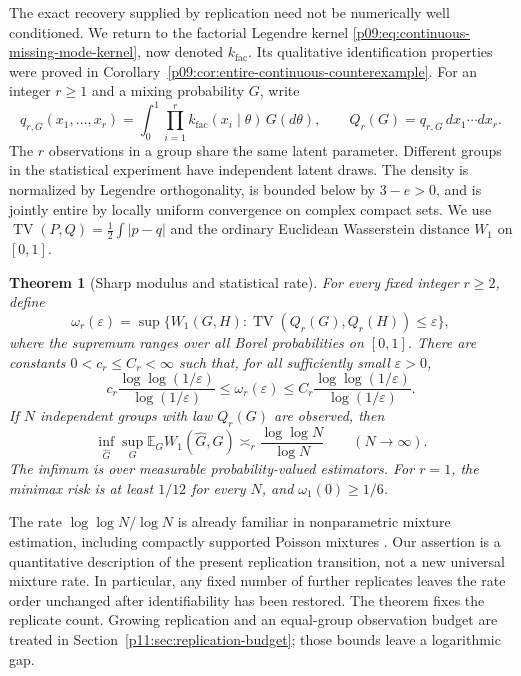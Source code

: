 \documentclass[11pt,letterpaper]{article}
\newtheorem{theorem}{Theorem}[section]
\theoremstyle{definition}
\theoremstyle{remark}
\newcommand{\1}{\mathbf 1}
\begin{document}
The exact recovery supplied by replication need not be numerically
well conditioned. We return to the factorial Legendre kernel
\eqref{p09:eq:continuous-missing-mode-kernel}, now denoted
$k_{\mathrm{fac}}$. Its qualitative identification properties were proved
in Corollary~\ref{p09:cor:entire-continuous-counterexample}.
For an integer $r\ge1$ and a mixing probability $G$, write
\begin{equation}\label{p10:eq:quant-r-view}
 q_{r,G}(x_1,\ldots,x_r)
   =\int_0^1\prod_{i=1}^r k_{\mathrm{fac}}(x_i\mid\theta)\,G(d\theta),
 \qquad Q_r(G)=q_{r,G}\,dx_1\cdots dx_r.
\end{equation}
The $r$ observations in a group share the same latent parameter.
Different groups in the statistical experiment have independent latent
draws. The density is normalized by Legendre orthogonality, is
bounded below by $3-e>0$, and is jointly entire by locally uniform
convergence on complex compact sets.  We use
$\operatorname{TV}(P,Q)=\tfrac12\int|p-q|$ and the ordinary
Euclidean Wasserstein distance $W_1$ on $[0,1]$.

\begin{theorem}[Sharp modulus and statistical rate]
\label{p10:thm:quant-factorial-rate}
For every fixed integer $r\ge2$, define
\[
 \omega_r(\varepsilon)=
 \sup\{W_1(G,H):\operatorname{TV}(Q_r(G),Q_r(H))\le\varepsilon\},
\]
where the supremum ranges over all Borel probabilities on $[0,1]$.
There are constants $0<c_r\le C_r<\infty$ such that, for all sufficiently
small $\varepsilon>0$,
\begin{equation}\label{p10:eq:quant-inverse-modulus}
 c_r\frac{\log\log(1/\varepsilon)}{\log(1/\varepsilon)}
 \le\omega_r(\varepsilon)
 \le C_r\frac{\log\log(1/\varepsilon)}{\log(1/\varepsilon)}.
\end{equation}
If $N$ independent groups with law $Q_r(G)$ are observed, then
\begin{equation}\label{p10:eq:quant-minimax}
 \inf_{\widehat G}\sup_G
   \mathbb E_G W_1(\widehat G,G)
 \asymp_r\frac{\log\log N}{\log N}
 \qquad(N\longrightarrow\infty).
\end{equation}
The infimum is over measurable probability-valued estimators.  For
$r=1$, the minimax risk is at least $1/12$ for every $N$, and
$\omega_1(0)\ge1/6$.
\end{theorem}

The rate $\log\log N/\log N$ is already familiar in nonparametric
mixture estimation, including compactly supported Poisson mixtures
\cite{MiaoEtAl2024}.  Our assertion is a quantitative description of
the present replication transition, not a new universal mixture rate.
In particular, any fixed number of further replicates leaves the rate
order unchanged after identifiability has been restored.  The theorem fixes the replicate count. Growing replication and an
equal-group observation budget are treated in
Section~\ref{p11:sec:replication-budget}; those bounds leave a logarithmic
gap.
\end{document}
